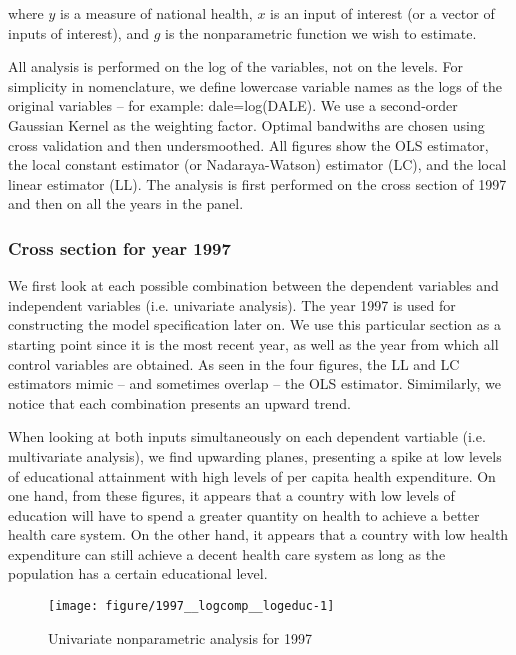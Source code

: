 \documentclass[12pt,a4paper]{article}\usepackage[]{graphicx}\usepackage[]{color}
\newenvironment{knitrout}{}{} %
\begin{document}
where $y$ is a measure of national health, $x$ is an input of interest (or a vector of inputs of interest), and $g$ is the nonparametric function we wish to estimate.

All analysis is performed on the log of the variables, not on the levels. For simplicity in nomenclature, we define lowercase variable names as the logs of the original variables -- for example: dale=log(DALE). We use a second-order Gaussian Kernel as the weighting factor. Optimal bandwiths are chosen using cross validation and then undersmoothed. All figures show the OLS estimator, the local constant estimator (or Nadaraya-Watson) estimator (LC), and the local linear estimator (LL). The analysis is first performed on the cross section of 1997 and then on all the years in the panel.





\subsubsection{Cross section for year 1997}

We first look at each possible combination between the dependent variables and independent variables (i.e. univariate analysis). The year 1997 is used for constructing the model specification later on. We use this particular section as a starting point since it is the most recent year, as well as the year from which all control variables are obtained. As seen in the four figures, the LL and LC estimators mimic -- and sometimes overlap -- the OLS estimator. Simimilarly, we notice that each combination presents an upward trend.

When looking at both inputs simultaneously on each dependent vartiable (i.e. multivariate analysis), we find upwarding planes, presenting a spike at low levels of educational attainment with high levels of per capita health expenditure. On one hand, from these figures, it appears that a country with low levels of education will have to spend a greater quantity on health to achieve a better health care system. On the other hand, it appears that a country with low health expenditure can still achieve a decent health care system as long as the population has a certain educational level.

\begin{knitrout}
\color{fgcolor}\begin{figure}[htbp]

{\centering \texttt{[image: figure/1997\_\_logcomp\_\_logeduc-1]} 

}

\caption[Univariate nonparametric analysis for 1997]{Univariate nonparametric analysis for 1997}\label{fig:1997, logcomp, logeduc}
\end{figure}


\end{knitrout}
\end{document}
